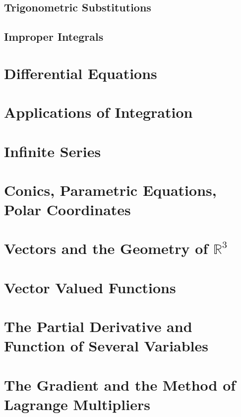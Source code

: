 \documentclass{amsbook}
\begin{document}
\section{Trigonometric Substitutions}

\section{Improper Integrals}


\chapter{Differential Equations}


\chapter{Applications of Integration}


\chapter{Infinite Series}

\chapter{Conics, Parametric Equations, Polar Coordinates}

\chapter{Vectors and the Geometry of $\mathbb{R}^3$}

\chapter{Vector Valued Functions}

\chapter{The Partial Derivative and Function of Several Variables}

\chapter{The Gradient and the Method of Lagrange Multipliers}
\end{document}

